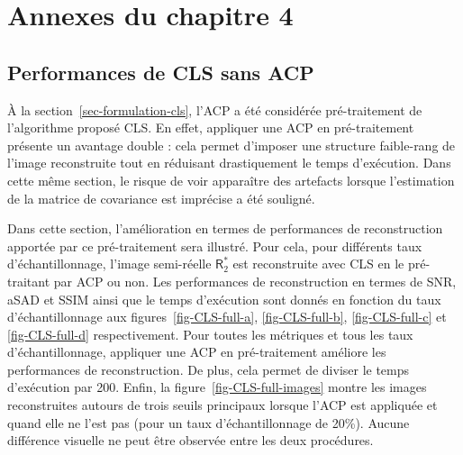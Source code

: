 \chapter{Annexes du chapitre 4}\label{annexe-3}
\dochaptoc

\section{Performances de CLS sans ACP}\label{sec-perfs-without-acp}

\`A la section~\ref{sec-formulation-cls}, l'ACP a été considérée pré-traitement de l'algorithme proposé CLS. En effet, appliquer une ACP en pré-traitement présente un avantage double : cela permet d'imposer une structure faible-rang de l'image reconstruite tout en réduisant drastiquement le temps d'exécution. Dans cette même section, le risque de voir apparaître des artefacts lorsque l'estimation de la matrice de covariance est imprécise a été souligné.

Dans cette section, l'amélioration en termes de performances de reconstruction apportée par ce pré-traitement sera illustré. Pour cela, pour différents taux d'échantillonnage, l'image semi-réelle $\mathsf{R}_2^*$ est reconstruite avec CLS en le pré-traitant par ACP ou non.
%
Les performances de reconstruction en termes de SNR, aSAD et SSIM ainsi que le temps d'exécution sont donnés en fonction du taux d'échantillonnage aux figures~\ref{fig-CLS-full-a}, \ref{fig-CLS-full-b}, \ref{fig-CLS-full-c} et \ref{fig-CLS-full-d} respectivement. Pour toutes les métriques et tous les taux d'échantillonnage, appliquer une ACP en pré-traitement améliore les performances de reconstruction. De plus, cela permet de diviser le temps d'exécution par 200. Enfin, la figure~\ref{fig-CLS-full-images} montre les images reconstruites autours de trois seuils principaux lorsque l'ACP est appliquée et quand elle ne l'est pas (pour un taux d'échantillonnage de 20\%). Aucune différence visuelle ne peut être observée entre les deux procédures.
 
